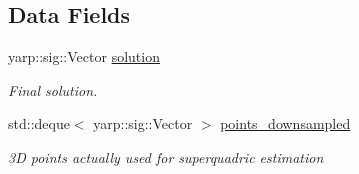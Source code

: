 \subsection*{Data Fields}
\begin{DoxyCompactItemize}
\item 
\mbox{\label{classSuperQuadric__NLP_abf380018deaca365a8b7cd837f36f1fa}} 
yarp\+::sig\+::\+Vector \mbox{\hyperlink{classSuperQuadric__NLP_abf380018deaca365a8b7cd837f36f1fa}{solution}}
\begin{DoxyCompactList}\small\item\em Final solution. \end{DoxyCompactList}\item 
\mbox{\label{classSuperQuadric__NLP_a9577e3ef86a127dec53a64953926c288}} 
std\+::deque$<$ yarp\+::sig\+::\+Vector $>$ \mbox{\hyperlink{classSuperQuadric__NLP_a9577e3ef86a127dec53a64953926c288}{points\+\_\+downsampled}}
\begin{DoxyCompactList}\small\item\em 3D points actually used for superquadric estimation \end{DoxyCompactList}\end{DoxyCompactItemize}
